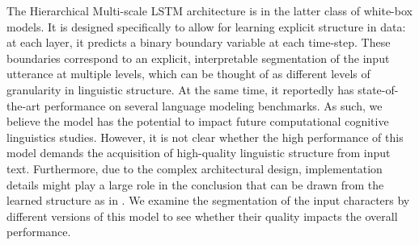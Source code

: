 The Hierarchical Multi-scale LSTM architecture \citep{chung2016hierarchical} is in 
the latter class of white-box models. It is designed specifically to allow for 
learning explicit structure in data: at each layer, it predicts a binary boundary 
variable at each time-step. These boundaries correspond to an explicit, 
interpretable segmentation of the input utterance at multiple levels, which can be 
thought of as different levels of granularity in linguistic structure. 
At the same time, it reportedly has state-of-the-art performance on several 
language modeling benchmarks. As such, we believe the model 
has the potential to impact future computational cognitive linguistics studies. 
However, it is not clear whether the high performance of this model demands
the acquisition of high-quality linguistic structure from input text. Furthermore, due to 
the complex architectural design, implementation details might play a large role in the 
conclusion that can be drawn from the learned structure 
as in \cite{williams2017learning}. We examine 
the segmentation of the input characters by different versions of this model to see
whether their quality impacts the overall performance.





